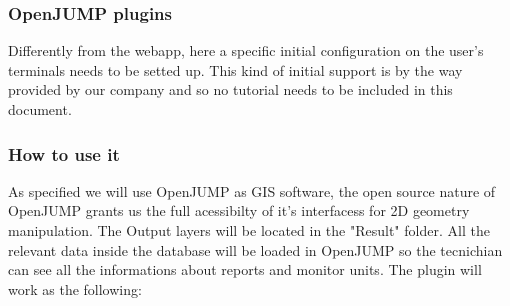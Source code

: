 \subsubsection{OpenJUMP plugins}
Differently from the webapp, here a specific initial configuration on the user's terminals needs to be setted up.
This kind of initial support is by the way provided by our company and so no tutorial needs to be included in this document.

\subsubsection{How to use it}

As specified we will use OpenJUMP as GIS software, the open source nature of OpenJUMP grants us the full acessibilty of it's interfacess for 2D geometry manipulation.
The Output layers will be located in the "Result" folder. All the relevant data inside the database will be loaded in OpenJUMP so the tecnichian can see all the informations about reports and monitor units.
The plugin will work as the following:

